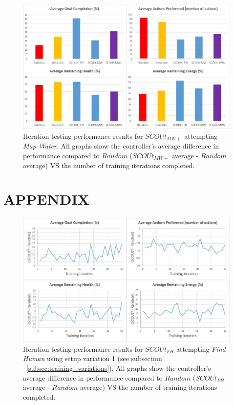 \begin{figure}[H]
  \includegraphics[width=1.0\columnwidth]{Figures/Results/Experiment2/AdditionalTraining/MapWaterPlus.JPG}
  \caption{Iteration testing performance results for $SCOUt_{MW+}$ attempting \textit{Map Water}. All graphs show the controller's average difference in performance compared to $Random$ ($SCOUt_{MW+}$ average - $Random$ average) VS the number of training iterations completed.}
  \label{fig:mapwaterplus_test_results}
\end{figure}






\chapter{APPENDIX}

\begin{figure}[H]
  \includegraphics[width=1.0\columnwidth]{Figures/Results/TrainingVariation1/FindHuman.JPG}
  \caption{Iteration testing performance results for $SCOUt_{FH}$ attempting \textit{Find Human} using setup variation 1 (see subsection ~\ref{subsec:training_variations}). All graphs show the controller's average difference in performance compared to $Random$ ($SCOUt_{FH}$ average - $Random$ average) VS the number of training iterations completed.}
  \label{fig:findhuman_training_variation1}
\end{figure}


